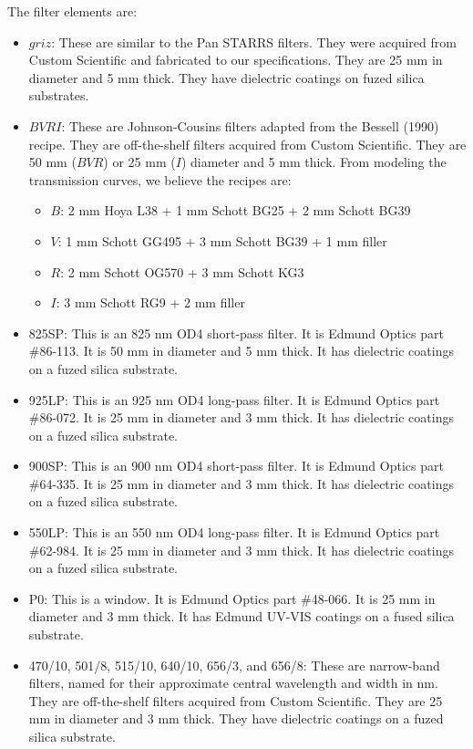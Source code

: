 The filter elements are:

\begin{itemize}
\item $griz$: These are similar to the Pan STARRS filters. They were acquired from Custom Scientific and fabricated to our specifications. They are 25 mm in diameter and 5 mm thick. They have dielectric coatings on fuzed silica substrates.
\item $BVRI$: These are Johnson-Cousins filters adapted from the Bessell (1990) recipe. They are off-the-shelf filters acquired from Custom Scientific. They are 50 mm ($BVR$) or 25 mm ($I$) diameter and 5 mm thick.
From modeling the transmission curves, we believe the recipes are:
\begin{itemize}
\item $B$: 2 mm Hoya L38 + 1 mm Schott BG25 + 2 mm Schott BG39
\item $V$: 1 mm Schott GG495 + 3 mm Schott BG39 + 1 mm filler
\item $R$: 2 mm Schott OG570 + 3 mm Schott KG3
\item $I$: 3 mm Schott RG9 + 2 mm filler
\end{itemize}
\item 825SP: This is an 825 nm OD4 short-pass filter. It is Edmund Optics part \#86-113. It is 50 mm in diameter and 5 mm thick. It has  dielectric coatings on a fuzed silica substrate.
\item 925LP: This is an 925 nm OD4 long-pass filter. It is Edmund Optics part \#86-072. It is 25 mm in diameter and 3 mm thick. It has  dielectric coatings on a fuzed silica substrate.
\item 900SP: This is an 900 nm OD4 short-pass filter. It is Edmund Optics part \#64-335. It is 25 mm in diameter and 3 mm thick. It has  dielectric coatings on a fuzed silica substrate.
\item 550LP: This is an 550 nm OD4 long-pass filter. It is Edmund Optics part \#62-984. It is 25 mm in diameter and 3 mm thick. It has dielectric coatings on a fuzed silica substrate.
\item P0: This is a window. It is Edmund Optics part \#48-066. It is 25 mm in diameter and 3 mm thick. It has Edmund UV-VIS coatings on a fused silica substrate.
\item 470/10, 501/8, 515/10, 640/10, 656/3, and 656/8: These are narrow-band filters, named for their approximate central wavelength and width in nm. They are off-the-shelf filters acquired from Custom Scientific. They are 25 mm in diameter and 3 mm thick. They have dielectric coatings on a fuzed silica substrate.


\end{itemize}
